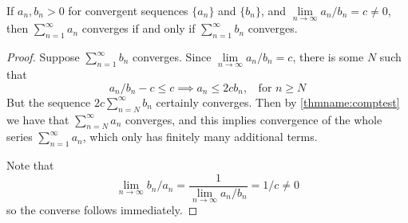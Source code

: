 \begin{namthm}\label{thmname:limcomptest}
    If $a_n, b_n > 0$ for convergent sequences $\{a_n\}$ and $\{b_n\}$, and $\lim\limits_{n\rightarrow \infty}a_n/b_n = c \neq 0$, then $\sum\limits_{n=1}^{\infty}a_n$ converges if and only if $\sum\limits_{n=1}^{\infty}b_n$ converges.
\end{namthm}
\begin{proof}
    Suppose $\sum\limits_{n=1}^{\infty}b_n$ converges. Since $\lim\limits_{n\rightarrow \infty}a_n/b_n = c$, there is some $N$ such that \begin{equation*}
        a_n/b_n - c \leq c \implies a_n \leq 2cb_n,\;\;\text{ for } n\geq N
    \end{equation*}
    But the sequence $2c\sum\limits_{n=N}^{\infty}b_n$ certainly converges. Then by \ref{thmname:comptest} we have that $\sum\limits_{n=N}^{\infty}a_n$ converges, and this implies convergence of the whole series $\sum\limits_{n=1}^{\infty}a_n$, which only has finitely many additional terms.
    
    Note that \begin{equation*}
        \lim\limits_{n\rightarrow \infty}b_n/a_n = \frac{1}{\lim\limits_{n\rightarrow\infty}a_n/b_n} = 1/c \neq 0
    \end{equation*}
    so the converse follows immediately.
\end{proof}


